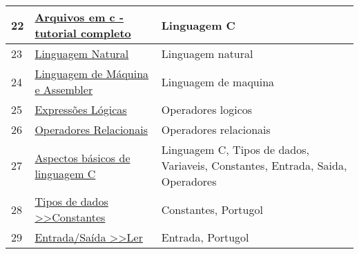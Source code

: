 \begin{longtable}{| p{} | p{} | p{} |}
22  & \href{http://www.cprogressivo.net/p/arquivos-em-c.html}{Arquivos em c - tutorial completo                                                   } & Linguagem C                                                                                                                                       \\ \hline
23  & \href{http://www.cristiancechinel.pro.br/my\_files/algorithms/bookhtml/node18.html}{Linguagem Natural                                                                   } & Linguagem natural                                                                                                                                 \\ \hline
24  & \href{http://www.cristiancechinel.pro.br/my\_files/algorithms/bookhtml/node19.html}{Linguagem de Máquina e Assembler                                                    } & Linguagem de maquina                                                                                                                              \\ \hline
25  & \href{http://www.cristiancechinel.pro.br/my\_files/algorithms/bookhtml/node43.html}{Expressões Lógicas                                                                  } & Operadores logicos                                                                                                                                \\ \hline
26  & \href{http://www.cristiancechinel.pro.br/my\_files/algorithms/bookhtml/node44.html}{Operadores Relacionais                                                              } & Operadores relacionais                                                                                                                            \\ \hline
27  & \href{http://www.dainf.cefetpr.br/~robson/prof/common/c/aspec.htm}{Aspectos básicos de linguagem C                                                     } & Linguagem C, Tipos de dados, Variaveis, Constantes, Entrada, Saida, Operadores                                                                    \\ \hline
28  & \href{http://www.dei.estt.ipt.pt/portugol/node/10}{Tipos de dados \textgreater{}\textgreater Constantes                                } & Constantes, Portugol                                                                                                                              \\ \hline
29  & \href{http://www.dei.estt.ipt.pt/portugol/node/14}{Entrada/Saída \textgreater{}\textgreater Ler                                        } & Entrada, Portugol                                                                                                                                 \\ \hline

\end{longtable}
